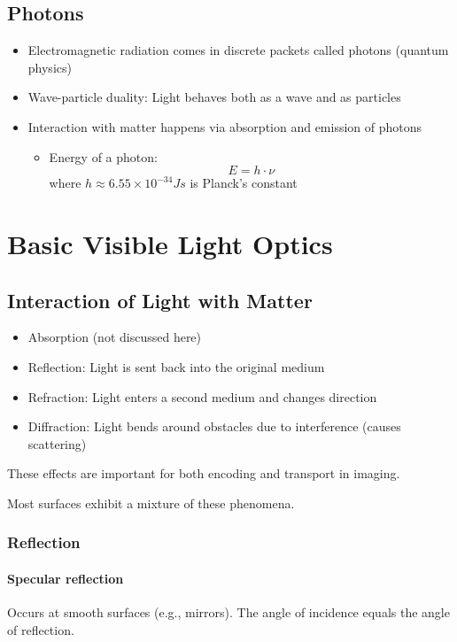 \documentclass{article}
\begin{document}
\subsection{Photons}
\begin{itemize}
  \item Electromagnetic radiation comes in discrete packets called photons (quantum physics)
  \item Wave-particle duality: Light behaves both as a wave and as particles
  \item Interaction with matter happens via absorption and emission of photons
  \begin{itemize}
    \item Energy of a photon:
    \[
    E = h \cdot \nu
    \]
    where $h \approx 6.55 \times 10^{-34} Js$ is Planck's constant 
  \end{itemize}
\end{itemize}

\section{Basic Visible Light Optics}

\subsection{Interaction of Light with Matter}
\begin{itemize}
  \item Absorption (not discussed here)
  \item Reflection: Light is sent back into the original medium
  \item Refraction: Light enters a second medium and changes direction
  \item Diffraction: Light bends around obstacles due to interference (causes scattering)
\end{itemize}

These effects are important for both encoding and transport in imaging.

Most surfaces exhibit a mixture of these phenomena.

\subsubsection{Reflection}

\paragraph{Specular reflection}
Occurs at smooth surfaces (e.g., mirrors). The angle of incidence equals the angle of reflection.
\end{document}
